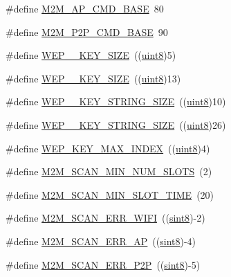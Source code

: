\begin{DoxyCompactItemize}
\item 
\#define \hyperlink{group__WlanDefines_gaf6815531611fc48229339c543f369a11}{M2\+M\+\_\+\+A\+P\+\_\+\+C\+M\+D\+\_\+\+B\+A\+SE}~80
\item 
\#define \hyperlink{group__WlanDefines_ga4063cac8470b367f1aa45df7d057345a}{M2\+M\+\_\+\+P2\+P\+\_\+\+C\+M\+D\+\_\+\+B\+A\+SE}~90
\item 
\#define \hyperlink{group__WlanDefines_ga7d5baa02b3f329278043baf0535daa50}{W\+E\+P\+\_\+\_\+\+K\+E\+Y\+\_\+\+S\+I\+ZE}~((\hyperlink{group__DataT_ga4df709a77647e870bbf1d955b8edc9a6}{uint8})5)
\item 
\#define \hyperlink{group__WlanDefines_gadbe04fcea97e8fbab9b38d8649049c47}{W\+E\+P\+\_\+\_\+\+K\+E\+Y\+\_\+\+S\+I\+ZE}~((\hyperlink{group__DataT_ga4df709a77647e870bbf1d955b8edc9a6}{uint8})13)
\item 
\#define \hyperlink{group__WlanDefines_ga4cfa81969980f3edea139634eeeb7ee1}{W\+E\+P\+\_\+\_\+\+K\+E\+Y\+\_\+\+S\+T\+R\+I\+N\+G\+\_\+\+S\+I\+ZE}~((\hyperlink{group__DataT_ga4df709a77647e870bbf1d955b8edc9a6}{uint8})10)
\item 
\#define \hyperlink{group__WlanDefines_ga087f8be759b11ec0fe841d21e60367f5}{W\+E\+P\+\_\+\_\+\+K\+E\+Y\+\_\+\+S\+T\+R\+I\+N\+G\+\_\+\+S\+I\+ZE}~((\hyperlink{group__DataT_ga4df709a77647e870bbf1d955b8edc9a6}{uint8})26)
\item 
\#define \hyperlink{group__WlanDefines_gad8adc3240afeb11434b2c34d5c15ea00}{W\+E\+P\+\_\+\+K\+E\+Y\+\_\+\+M\+A\+X\+\_\+\+I\+N\+D\+EX}~((\hyperlink{group__DataT_ga4df709a77647e870bbf1d955b8edc9a6}{uint8})4)
\item 
\#define \hyperlink{group__WlanDefines_gac12991014d0b3fa80110e85b07235e4d}{M2\+M\+\_\+\+S\+C\+A\+N\+\_\+\+M\+I\+N\+\_\+\+N\+U\+M\+\_\+\+S\+L\+O\+TS}~(2)
\item 
\#define \hyperlink{group__WlanDefines_gad6bb7f6e8dd156db1a61f8d481f24de3}{M2\+M\+\_\+\+S\+C\+A\+N\+\_\+\+M\+I\+N\+\_\+\+S\+L\+O\+T\+\_\+\+T\+I\+ME}~(20)
\item 
\#define \hyperlink{group__WlanDefines_ga247a2194812ca3aa0e44e5622d1d879b}{M2\+M\+\_\+\+S\+C\+A\+N\+\_\+\+E\+R\+R\+\_\+\+W\+I\+FI}~((\hyperlink{group__DataT_gae35f10ffd0ac8dd2bc3e794da9bdfbc7}{sint8})-\/2)
\item 
\#define \hyperlink{group__WlanDefines_ga827d6a8e447449c6bb4b6c97943d22ba}{M2\+M\+\_\+\+S\+C\+A\+N\+\_\+\+E\+R\+R\+\_\+\+AP}~((\hyperlink{group__DataT_gae35f10ffd0ac8dd2bc3e794da9bdfbc7}{sint8})-\/4)
\item 
\#define \hyperlink{group__WlanDefines_gae1461b3ea611371e41f64a1d05cfd6db}{M2\+M\+\_\+\+S\+C\+A\+N\+\_\+\+E\+R\+R\+\_\+\+P2P}~((\hyperlink{group__DataT_gae35f10ffd0ac8dd2bc3e794da9bdfbc7}{sint8})-\/5)

\end{DoxyCompactItemize}
